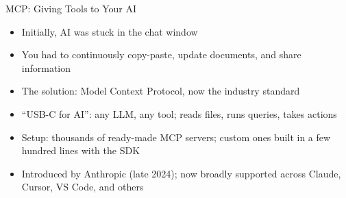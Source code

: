 \documentclass[aspectratio=169]{beamer}
\begin{document}
\begin{frame}{MCP: Giving Tools to Your AI}
    \begin{itemize}
        \item Initially, AI was stuck in the chat window
        \vspace{0.6em}
        \item You had to continuously copy-paste, update documents, and share information
        \vspace{0.6em}
        \item The solution: Model Context Protocol, now the industry standard
        \vspace{0.6em}
        \item ``USB-C for AI'': any LLM, any tool; reads files, runs queries, takes actions
        \vspace{0.6em}
        \item Setup: thousands of ready-made MCP servers; custom ones built in a few hundred lines with the SDK
        \vspace{0.6em}
        \item Introduced by Anthropic (late 2024); now broadly supported across Claude, Cursor, VS Code, and others
    \end{itemize}
\end{frame}
\end{document}
